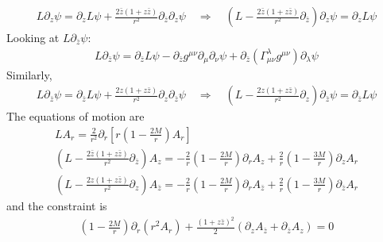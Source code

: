 \documentclass[12pt]{article}
\begin{document}
\begin{gather}
L
\partial_{z}
\psi
=
\partial_{z}
L\psi
+
\frac{2 \bar{z} (1 + z \bar{z})}{r^{2}}
\partial_{\bar{z}} \partial_{z} \psi
\quad
\Rightarrow
\quad
\left(
L
-
\frac{2 \bar{z} (1 + z \bar{z})}{r^{2}}
\partial_{\bar{z}} 
\right)
\partial_{z} \psi
=
\partial_{z}
L\psi
\end{gather}
Looking at $L \partial_{\bar{z}}\psi$:
\begin{gather}
L \partial_{\bar{z}}\psi
=
\partial_{\bar{z}}
L\psi
-
\partial_{\bar{z}} g^{\mu\nu}
\partial_{\mu} \partial_{\nu} \psi
+
\partial_{\bar{z}}(\Gamma^{\lambda}_{\mu\nu}
g^{\mu\nu}) 
\partial_{\lambda} \psi
\end{gather}
Similarly,
\begin{gather}
L
\partial_{\bar{z}}
\psi
=
\partial_{\bar{z}}
L\psi
+
\frac{2 z (1 + z \bar{z})}{r^{2}}
\partial_{z} \partial_{\bar{z}} \psi
\quad
\Rightarrow
\quad
\left(
L
-
\frac{2 z (1 + z \bar{z})}{r^{2}}
\partial_{z} 
\right)
\partial_{\bar{z}} \psi
=
\partial_{\bar{z}}
L\psi
\end{gather}
The equations of motion are
\begin{gather}
L A_{r}
=
\frac{2}{r^{2}}
\partial_{r}
\left[
r
(1-
\frac{2 M}{r})
A_{r}
\right]
\label{SimpEqu1}
\\
\left(L 
-
\frac{2 \bar{z} (1 + z \bar{z})}{r^{2}}
\partial_{\bar{z}}
\right)
A_{z}
=
-
\frac{2}{r}
(1 - \frac{2 M}{r})
\partial_{r}
A_{z}
+
\frac{2}{r}
(1 - \frac{3 M}{r})
\partial_{z}
A_{r}
\label{SimpEqu2}
\\
\left(
L 
-
\frac{2 z (1 + z \bar{z})}{r^{2}}
\partial_{z}
\right)
A_{\bar{z}}
=
-
\frac{2}{r}
(1 - \frac{2 M}{r})
\partial_{r}
A_{\bar{z}}
+
\frac{2}{r}
(1 - \frac{3 M}{r})
\partial_{\bar{z}}
A_{r}
\label{SimpEqu3}
\end{gather}
and the constraint is
\begin{gather}
(1 - \frac{2 M}{r})
\partial_{r}
(r^{2}
A_{r})
+
\frac{(1 + z \bar{z})^{2}}{2}
(\partial_{z} A_{\bar{z}} + \partial_{\bar{z}} A_{z})
=0
\label{ConstraintEqu}
\end{gather}
\end{document}
